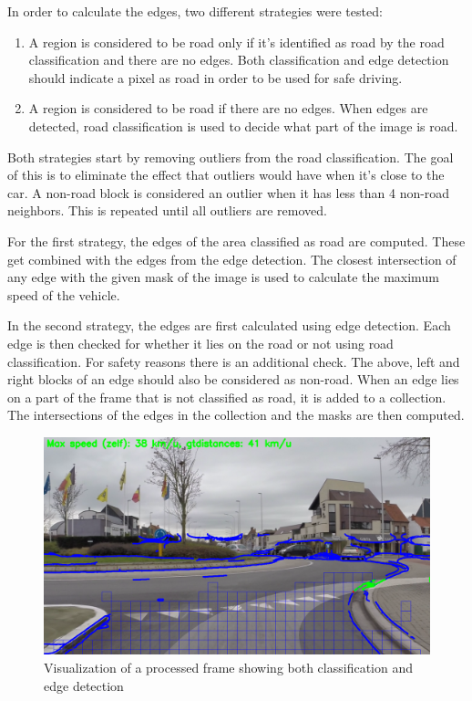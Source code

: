 \documentclass[runningheads,a4paper]{llncs}
\begin{document}
In order to calculate the edges, two different strategies were tested:
\begin{enumerate}
\item  A region is considered to be road only if it's identified as road by the road classification and there are no edges. Both classification and edge detection should indicate a pixel as road in order to be used for safe driving.
\item A region is considered to be road if there are no edges. When edges are detected, road classification is used to decide what part of the image is road. 
\end{enumerate} 

Both strategies start by removing outliers from the road classification. The goal of this is to eliminate the effect that outliers would have when it's close to the car. A non-road block is considered an outlier when it has less than 4 non-road neighbors. This is repeated until all outliers are removed.

For the first strategy, the edges of the area classified as road are computed. These get combined with the edges from the edge detection. The closest intersection of any edge with the given mask of the image is used to calculate the maximum speed of the vehicle. 

In the second strategy, the edges are first calculated using edge detection. Each edge is then checked for whether it lies on the road or not using road classification. For safety reasons there is an additional check. The above, left and right blocks of an edge should also be considered as non-road. When an edge lies on a part of the frame that is not classified as road, it is added to a collection. The intersections of the edges in the collection and the masks are then computed. 

\begin{figure}[t]
  \centering
  \includegraphics[width=.9\textwidth]{fig/frame00025.png}
  \caption{Visualization of a processed frame showing both classification and edge detection}
  \label{visualization}
\end{figure}
\end{document}
